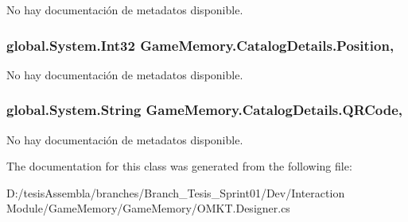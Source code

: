 No hay documentación de metadatos disponible. 

\hypertarget{class_game_memory_1_1_catalog_details_a4b69bad6ac79c610a167f11271a2acf4}{
\subsubsection[{Position}]{\setlength{\rightskip}{0pt plus 5cm}global.\-System.\-Int32 Game\-Memory.\-Catalog\-Details.\-Position\hspace{0.3cm}{\ttfamily [get]}, {\ttfamily [set]}}}\label{class_game_memory_1_1_catalog_details_a4b69bad6ac79c610a167f11271a2acf4}


No hay documentación de metadatos disponible. 

\hypertarget{class_game_memory_1_1_catalog_details_a0602f3d016450f9cb6f0d3ff955bac2b}{
\subsubsection[{Q\-R\-Code}]{\setlength{\rightskip}{0pt plus 5cm}global.\-System.\-String Game\-Memory.\-Catalog\-Details.\-Q\-R\-Code\hspace{0.3cm}{\ttfamily [get]}, {\ttfamily [set]}}}\label{class_game_memory_1_1_catalog_details_a0602f3d016450f9cb6f0d3ff955bac2b}


No hay documentación de metadatos disponible. 



The documentation for this class was generated from the following file\-:\begin{DoxyCompactItemize}
\item 
D\-:/tesis\-Assembla/branches/\-Branch\-\_\-\-Tesis\-\_\-\-Sprint01/\-Dev/\-Interaction Module/\-Game\-Memory/\-Game\-Memory/O\-M\-K\-T.\-Designer.\-cs\end{DoxyCompactItemize}

